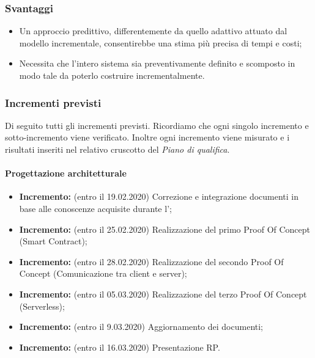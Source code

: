 \subsubsection{Svantaggi}
\begin{itemize}
	\item Un approccio predittivo, differentemente da quello adattivo attuato dal modello incrementale, consentirebbe una stima più precisa di tempi e costi;
	\item Necessita che l'intero sistema sia preventivamente definito e scomposto in modo tale da poterlo costruire incrementalmente.
\end{itemize}
\subsubsection{Incrementi previsti}
Di seguito tutti gli incrementi previsti. Ricordiamo che ogni singolo incremento e sotto-incremento viene verificato. Inoltre ogni incremento viene misurato e i risultati inseriti nel relativo cruscotto del \textit{Piano di qualifica}\docs.
\paragraph{Progettazione architetturale}
\begin{itemize}
  \item \textbf{ Incremento:} (entro il 19.02.2020) Correzione e integrazione documenti in base alle conoscenze acquisite durante l'\docs;
  \item \textbf{ Incremento:} (entro il 25.02.2020) Realizzazione del primo Proof Of Concept (Smart Contract);
  \item \textbf{ Incremento:} (entro il 28.02.2020) Realizzazione del secondo Proof Of Concept (Comunicazione tra client e server);
  \item \textbf{ Incremento:} (entro il 05.03.2020) Realizzazione del terzo Proof Of Concept (Serverless);
  \item \textbf{ Incremento:} (entro il 9.03.2020) Aggiornamento dei documenti;
  \item \textbf{ Incremento:} (entro il 16.03.2020) Presentazione RP.
\end{itemize}

